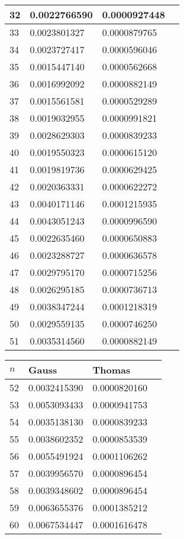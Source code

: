 \documentclass{article}
\begin{document}
\begin{table}[H]
{\begin{tabular}{|l|l|l|l|}
32 & 0.0022766590 & 0.0000927448 \\ \hline
33 & 0.0023801327 & 0.0000879765 \\ \hline
34 & 0.0023727417 & 0.0000596046 \\ \hline
35 & 0.0015447140 & 0.0000562668 \\ \hline
36 & 0.0016992092 & 0.0000882149 \\ \hline
37 & 0.0015561581 & 0.0000529289 \\ \hline
38 & 0.0019032955 & 0.0000991821 \\ \hline
39 & 0.0028629303 & 0.0000839233 \\ \hline
40 & 0.0019550323 & 0.0000615120 \\ \hline
41 & 0.0019819736 & 0.0000629425 \\ \hline
42 & 0.0020363331 & 0.0000622272 \\ \hline
43 & 0.0040171146 & 0.0001215935 \\ \hline
44 & 0.0043051243 & 0.0000996590 \\ \hline
45 & 0.0022635460 & 0.0000650883 \\ \hline
46 & 0.0023288727 & 0.0000636578 \\ \hline
47 & 0.0029795170 & 0.0000715256 \\ \hline
48 & 0.0026295185 & 0.0000736713 \\ \hline
49 & 0.0038347244 & 0.0001218319 \\ \hline
50 & 0.0029559135 & 0.0000746250 \\ \hline
51 & 0.0035314560 & 0.0000882149 \\ \hline
\end{tabular}
}
\parbox{.45\linewidth}{
\begin{tabular}{|l|l|l|l|}
\hline
$n$ & Gauss & Thomas \\ \hline
52 & 0.0032415390 & 0.0000820160 \\ \hline
53 & 0.0053093433 & 0.0000941753 \\ \hline
54 & 0.0035138130 & 0.0000839233 \\ \hline
55 & 0.0038602352 & 0.0000853539 \\ \hline
56 & 0.0055491924 & 0.0001106262 \\ \hline
57 & 0.0039956570 & 0.0000896454 \\ \hline
58 & 0.0039348602 & 0.0000896454 \\ \hline
59 & 0.0063655376 & 0.0001385212 \\ \hline
60 & 0.0067534447 & 0.0001616478 \\ \hline

\end{tabular}}
\end{table}
\end{document}

